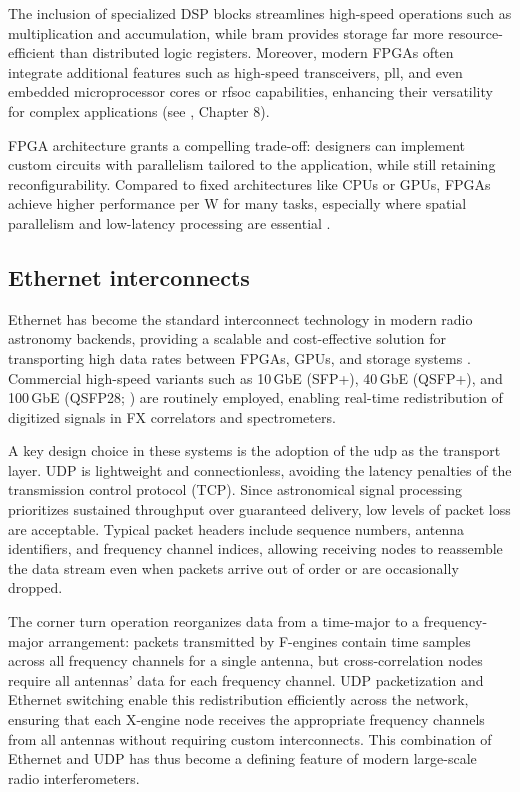 The inclusion of specialized DSP blocks streamlines high-speed operations such as multiplication and accumulation, while \gls{bram} provides storage far more resource-efficient than distributed logic registers. Moreover, modern FPGAs often integrate additional features such as high-speed transceivers, \gls{pll}, and even embedded microprocessor cores or \gls{rfsoc} capabilities, enhancing their versatility for complex applications (see \citealt{zhang2018fpga}, Chapter 8).

FPGA architecture grants a compelling trade-off: designers can implement custom circuits with parallelism tailored to the application, while still retaining reconfigurability. Compared to fixed architectures like CPUs or GPUs, FPGAs achieve higher performance per \si{\watt} for many tasks, especially where spatial parallelism and low-latency processing are essential \citep{kuon2008fpga,zhang2018fpga}.

\subsection{Ethernet interconnects}

Ethernet has become the standard interconnect technology in modern radio astronomy backends, providing a scalable and cost-effective solution for transporting high data rates between FPGAs, GPUs, and storage systems \citep{Price_2020}. Commercial high-speed variants such as 10\,GbE (SFP+), 40\,GbE (QSFP+), and 100\,GbE (QSFP28; \citealt{IEEE8023bm2015}) are routinely employed, enabling real-time redistribution of digitized signals in FX correlators and spectrometers.  

A key design choice in these systems is the adoption of the \gls{udp} as the transport layer. UDP is lightweight and connectionless, avoiding the latency penalties of the transmission control protocol (TCP). Since astronomical signal processing prioritizes sustained throughput over guaranteed delivery, low levels of packet loss are acceptable. Typical packet headers include sequence numbers, antenna identifiers, and frequency channel indices, allowing receiving nodes to reassemble the data stream even when packets arrive out of order or are occasionally dropped.  

The corner turn operation reorganizes data from a time-major to a frequency-major arrangement: packets transmitted by F-engines contain time samples across all frequency channels for a single antenna, but cross-correlation nodes require all antennas' data for each frequency channel. UDP packetization and Ethernet switching enable this redistribution efficiently across the network, ensuring that each X-engine node receives the appropriate frequency channels from all antennas without requiring custom interconnects. This combination of Ethernet and UDP has thus become a defining feature of modern large-scale radio interferometers.


